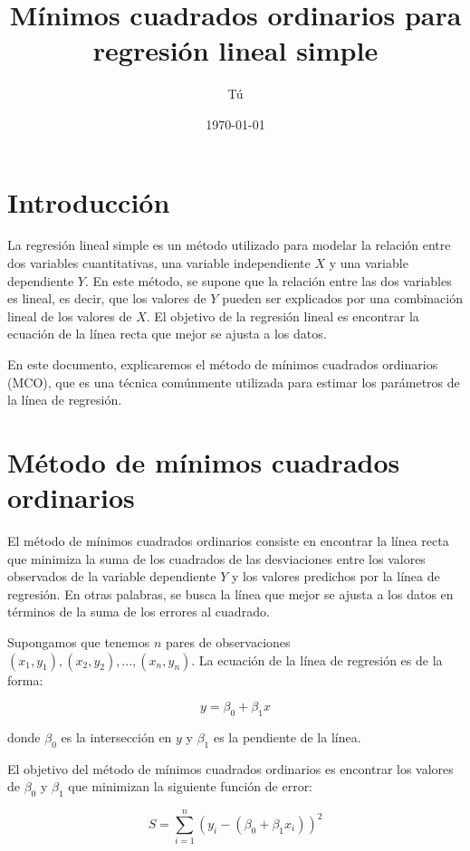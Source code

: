 \documentclass{article}
\title{Mínimos cuadrados ordinarios para regresión lineal simple}
\author{Tú}
\date{\today}
\begin{document}
\maketitle

\section{Introducción}

La regresión lineal simple es un método utilizado para modelar la relación entre dos variables cuantitativas, una variable independiente $X$ y una variable dependiente $Y$. En este método, se supone que la relación entre las dos variables es lineal, es decir, que los valores de $Y$ pueden ser explicados por una combinación lineal de los valores de $X$. El objetivo de la regresión lineal es encontrar la ecuación de la línea recta que mejor se ajusta a los datos.

En este documento, explicaremos el método de mínimos cuadrados ordinarios (MCO), que es una técnica comúnmente utilizada para estimar los parámetros de la línea de regresión.

\section{Método de mínimos cuadrados ordinarios}

El método de mínimos cuadrados ordinarios consiste en encontrar la línea recta que minimiza la suma de los cuadrados de las desviaciones entre los valores observados de la variable dependiente $Y$ y los valores predichos por la línea de regresión. En otras palabras, se busca la línea que mejor se ajusta a los datos en términos de la suma de los errores al cuadrado.

Supongamos que tenemos $n$ pares de observaciones $(x_1,y_1), (x_2,y_2), ..., (x_n,y_n)$. La ecuación de la línea de regresión es de la forma:

\begin{equation}
y = \beta_0 + \beta_1 x
\end{equation}

donde $\beta_0$ es la intersección en $y$ y $\beta_1$ es la pendiente de la línea.

El objetivo del método de mínimos cuadrados ordinarios es encontrar los valores de $\beta_0$ y $\beta_1$ que minimizan la siguiente función de error:

\begin{equation}
S = \sum_{i=1}^n (y_i - (\beta_0 + \beta_1 x_i))^2
\end{equation}
\end{document}
